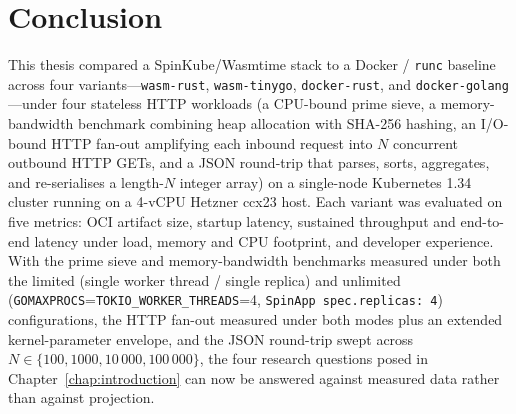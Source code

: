 \chapter{Conclusion}
\label{chap:conclusion}

\begin{sloppypar}
This thesis compared a SpinKube/Wasmtime stack to a Docker / \texttt{runc} baseline across four variants---\texttt{wasm-rust}, \texttt{wasm-tinygo}, \texttt{docker-rust}, and \texttt{docker-golang}---under four stateless \acs{HTTP} workloads (a \acs{CPU}-bound prime sieve, a memory-bandwidth benchmark combining heap allocation with SHA-256 hashing, an I/O-bound HTTP fan-out amplifying each inbound request into $N$ concurrent outbound \acs{HTTP} GETs, and a \acs{JSON} round-trip that parses, sorts, aggregates, and re-serialises a length-$N$ integer array) on a single-node Kubernetes 1.34 cluster running on a 4-vCPU Hetzner ccx23 host. Each variant was evaluated on five metrics: \acs{OCI} artifact size, startup latency, sustained throughput and end-to-end latency under load, memory and \acs{CPU} footprint, and developer experience. With the prime sieve and memory-bandwidth benchmarks measured under both the limited (single worker thread / single replica) and unlimited (\texttt{GOMAXPROCS}=\texttt{TOKIO\_WORKER\_THREADS}=4, \texttt{SpinApp~spec.replicas:~4}) configurations, the HTTP fan-out measured under both modes plus an extended kernel-parameter envelope, and the \acs{JSON} round-trip swept across $N \in \{100, 1000, 10\,000, 100\,000\}$, the four research questions posed in Chapter~\ref{chap:introduction} can now be answered against measured data rather than against projection.
\end{sloppypar}

